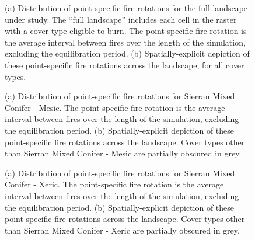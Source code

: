 \begin{figure}[!htbp]
  \centering
  \qquad
  \caption{(a) Distribution of point-specific fire rotations for the full landscape under study. The ``full landscape'' includes each cell in the raster with a cover type eligible to burn. The point-specific fire rotation is the average interval between fires over the length of the simulation, excluding the equilibration period. (b) Spatially-explicit depiction of these point-specific fire rotations across the landscape, for all cover types.}
  \label{fig:preturn}
\end{figure}

\begin{figure}[!htbp]
  \centering
  \caption{(a) Distribution of point-specific fire rotations for Sierran Mixed Conifer - Mesic. The point-specific fire rotation is the average interval between fires over the length of the simulation, excluding the equilibration period. (b) Spatially-explicit depiction of these point-specific fire rotations across the landscape. Cover types other than Sierran Mixed Conifer - Mesic are partially obscured in grey.}
\label{fig:preturn_smcm}
\end{figure}

\begin{figure}[!htbp]
  \centering
  \caption{(a) Distribution of point-specific fire rotations for Sierran Mixed Conifer - Xeric. The point-specific fire rotation is the average interval between fires over the length of the simulation, excluding the equilibration period. (b) Spatially-explicit depiction of these point-specific fire rotations across the landscape. Cover types other than Sierran Mixed Conifer - Xeric are partially obscured in grey.}
\label{fig:preturn_smcx}
\end{figure}

